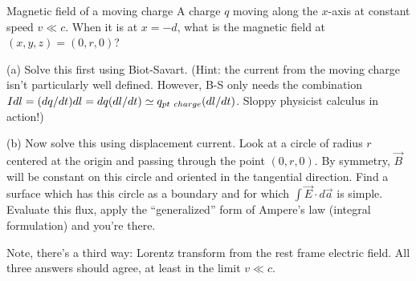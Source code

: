 \documentclass[makesolutionspdf]{esg8022pset}
\begin{document}
\begin{problem}{ Magnetic field of a moving charge}
A charge $q$ moving
along the $x$-axis at constant speed $v \ll c$.  When it is at $x =
-d$, what is the magnetic field at $(x,y,z) = (0,r,0)$?

\par\noindent (a)  Solve this first using Biot-Savart.  (Hint:
the current from the moving charge isn't particularly well defined.
However, B-S only needs the combination $I dl = (dq/dt) dl = dq
(dl/dt) \simeq q_{\rm pt\ charge}(dl/dt)$.  Sloppy physicist calculus
in action!)

\par\noindent (b)  Now solve this using displacement current.
Look at a circle of radius $r$ centered at the origin and passing
through the point $(0,r,0)$.  By symmetry, $\vec B$ will be constant
on this circle and oriented in the tangential direction.  Find a
surface which has this circle as a boundary and for which $\int \vec
E\cdot d\vec a$ is simple.  Evaluate this flux, apply the
``generalized'' form of Ampere's law (integral formulation) and you're
there.

\par\noindent Note, there's a third way: Lorentz transform from the
rest frame electric field.  All
three answers should agree, at least in the limit $v \ll c$.

\end{problem}
\end{document}
